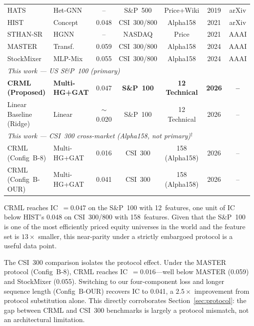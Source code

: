\documentclass[journal]{IEEEtran}
\begin{document}
\begin{table}[!t]
\begin{tabular}{llccccc}
HATS~\cite{kim2019hats}           & Het-GNN   & --    & S\&P~500     & Price+Wiki & 2019 & arXiv\\
HIST~\cite{xu2021hist}            & Concept   & 0.048 & CSI~300/800  & Alpha158   & 2021 & arXiv\\
STHAN-SR~\cite{sawhney2021sthan}  & HGNN      & --    & NASDAQ       & Price      & 2021 & AAAI\\
MASTER~\cite{li2024master}        & Transf.   & 0.059 & CSI~300/800  & Alpha158   & 2024 & AAAI\\
StockMixer~\cite{fan2024stockmixer} & MLP-Mix & 0.055 & CSI~300/800  & Alpha158   & 2024 & AAAI\\
\midrule
\multicolumn{7}{l}{\textit{This work --- US S\&P~100 (primary)}}\\
\textbf{CRML (Proposed)} & \textbf{Multi-HG+GAT} & $\mathbf{0.047}$
  & \textbf{S\&P~100} & \textbf{12 Technical} & \textbf{2026} & \textbf{--}\\
Linear Baseline (Ridge) & Linear & $\sim$0.020 & S\&P~100 & 12 Technical & 2026 & --\\
\midrule
\multicolumn{7}{l}{\textit{This work --- CSI~300 cross-market
                   (Alpha158, not primary)$^\dagger$}}\\
CRML (Config~B-8) & Multi-HG+GAT & 0.016 & CSI~300 & 158 (Alpha158) & 2026 & --\\
CRML (Config~B-OUR) & Multi-HG+GAT & 0.041 & CSI~300 & 158 (Alpha158) & 2026 & --\\
\bottomrule
\end{tabular}
\end{table}

CRML reaches IC~$=0.047$ on the S\&P~100 with 12~features, one unit of
IC below HIST's 0.048 on CSI~300/800 with 158~features. Given that the
S\&P~100 is one of the most efficiently priced equity universes in the
world and the feature set is $13\times$ smaller, this near-parity under
a strictly embargoed protocol is a useful data point.

The CSI~300 comparison isolates the protocol effect. Under the MASTER
protocol (Config~B-8), CRML reaches IC~$=0.016$---well below MASTER
(0.059) and StockMixer (0.055). Switching to our four-component loss and
longer sequence length (Config~B-OUR) recovers IC to 0.041, a $2.5\times$
improvement from protocol substitution alone. This directly corroborates
Section~\ref{sec:protocol}: the gap between CRML and CSI~300 benchmarks
is largely a protocol mismatch, not an architectural limitation.
\end{document}
